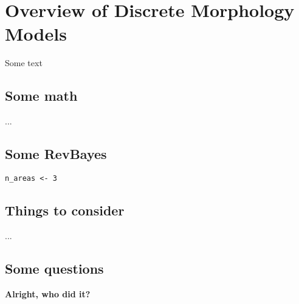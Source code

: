 \section{Overview of Discrete Morphology Models} \label{sec:dm_overview}

Some text

\subsection{Some math}

...

\subsection{Some RevBayes}

\begin{snugshade}
\begin{lstlisting}
n_areas <- 3
\end{lstlisting}
\end{snugshade}


\subsection{Things to consider}

...


\subsection{Some questions}

{\bf {} Alright, who did it?}

\newpage
